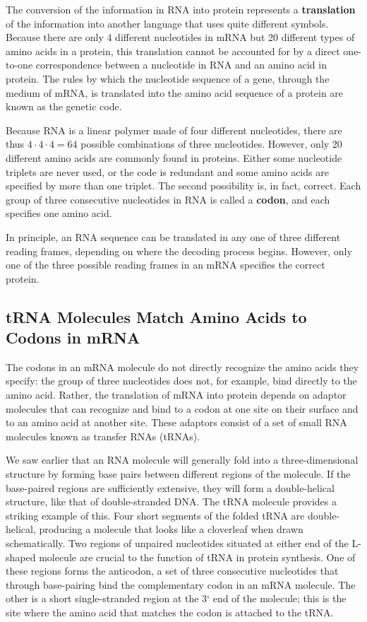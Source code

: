 The conversion of the information in RNA into protein represents a \textbf{translation}
of the information into another language that uses
quite different symbols. Because there are only 4 different nucleotides in
mRNA but 20 different types of amino acids in a protein, this translation
cannot be accounted for by a direct one-to-one correspondence between
a nucleotide in RNA and an amino acid in protein. The rules by which the
nucleotide sequence of a gene, through the medium of mRNA, is translated
into the amino acid sequence of a protein are known as the genetic
code.

Because RNA is a linear polymer made of four different
nucleotides, there are thus $4 \cdot 4 \cdot 4 = 64$ possible combinations of
three nucleotides. However, only 20 different amino acids are commonly
found in proteins. Either some nucleotide triplets are never used, or
the code is redundant and some amino acids are
specified by more than one triplet. The second possibility is, in fact, correct.
Each group of three consecutive nucleotides in RNA is called a \textbf{codon},
and each specifies one amino acid.

In principle, an RNA sequence can be translated in any one of three different
reading frames, depending on where the decoding process begins. However,
only one of the three possible reading frames in an mRNA specifies the correct protein.

\subsection{tRNA Molecules Match Amino Acids to Codons in mRNA}

The codons in an mRNA molecule do not directly recognize the amino
acids they specify: the group of three nucleotides does not, for example,
bind directly to the amino acid. Rather, the translation of mRNA into
protein depends on adaptor molecules that can recognize and bind to a
codon at one site on their surface and to an amino acid at another site.
These adaptors consist of a set of small RNA molecules known as transfer RNAs (tRNAs).

We saw earlier that an RNA molecule will generally fold into a three-dimensional
structure by forming base pairs between different regions
of the molecule. If the base-paired regions are sufficiently extensive, they
will form a double-helical structure, like that of double-stranded DNA.
The tRNA molecule provides a striking example of this. Four short segments
of the folded tRNA are double-helical, producing a molecule that
looks like a cloverleaf when drawn schematically.
Two regions of unpaired nucleotides situated at either end of the L-shaped
molecule are crucial to the function of tRNA in protein synthesis. One
of these regions forms the anticodon, a set of three consecutive nucleotides
that through base-pairing bind the complementary codon in an
mRNA molecule. The other is a short single-stranded region at the 3` end
of the molecule; this is the site where the amino acid that matches the
codon is attached to the tRNA.

